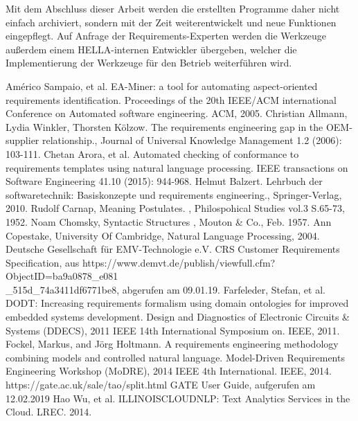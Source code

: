 \documentclass[12pt]{report}
\begin{document}
Mit dem Abschluss dieser Arbeit werden die erstellten Programme daher nicht einfach archiviert, sondern mit der Zeit weiterentwickelt und neue Funktionen eingepflegt.
Auf Anfrage der Requirements-Experten werden die Werkzeuge außerdem einem HELLA-internen Entwickler übergeben, welcher die Implementierung der Werkzeuge für den Betrieb weiterführen wird. 

\newpage
\begin{thebibliography}{20}
Américo Sampaio, et al. \glqq EA-Miner: a tool for automating aspect-oriented requirements identification.\grqq{} Proceedings of the 20th IEEE/ACM international Conference on Automated software engineering. ACM, 2005.
 Christian Allmann, Lydia Winkler, Thorsten Kölzow. \glqq The requirements engineering gap in the OEM-supplier relationship.\grqq , Journal of Universal Knowledge Management 1.2 (2006): 103-111.
Chetan Arora, et al. \glqq Automated checking of conformance to requirements templates using natural language processing.\grqq{} IEEE transactions on Software Engineering 41.10 (2015): 944-968.
Helmut Balzert. \glqq Lehrbuch der softwaretechnik: Basiskonzepte und requirements engineering.\grqq , Springer-Verlag, 2010.
Rudolf Carnap, \glqq  Meaning Postulates.\grqq{} , Philospohical Studies vol.3 S.65-73, 1952.
 Noam Chomsky, \glqq  Syntactic Structures\grqq{} , Mouton \& Co., Feb. 1957.
Ann Copestake, University Of Cambridge, \glqq Natural Language Processing\grqq , 2004.
 Deutsche Gesellschaft für EMV-Technologie e.V. \glqq CRS Customer Requirements Specification\grqq, aus https://www.demvt.de/publish/viewfull.cfm?ObjectID=ba9a0878\_e081\\ \_515d\_74a3411df6771be8, abgerufen am 09.01.19.
 Farfeleder, Stefan, et al. \glqq DODT: Increasing requirements formalism using domain ontologies for improved embedded systems development. \grqq{} Design and Diagnostics of Electronic Circuits \& Systems (DDECS), 2011 IEEE 14th International Symposium on. IEEE, 2011.
 Fockel, Markus, and Jörg Holtmann. \glqq A requirements engineering methodology combining models and controlled natural language.\grqq{} Model-Driven Requirements Engineering Workshop (MoDRE), 2014 IEEE 4th International. IEEE, 2014.
 https://gate.ac.uk/sale/tao/split.html GATE User Guide, aufgerufen am 12.02.2019
 Hao Wu, et al. \glqq  ILLINOISCLOUDNLP: Text Analytics Services in the Cloud.\grqq{}  LREC. 2014.

\end{thebibliography}
\end{document}
